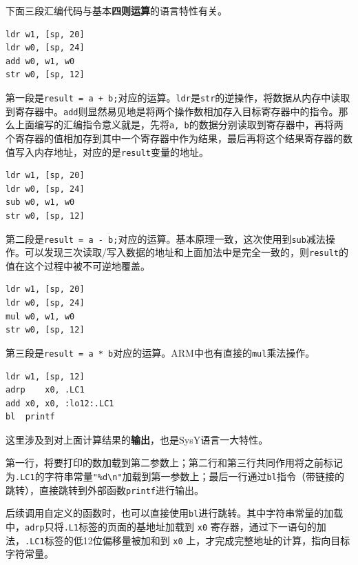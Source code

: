 \documentclass[UTF8,a4paper,10pt]{ctexart}
\begin{document}
\vspace{1em}

下面三段汇编代码与基本\textbf{四则运算}的语言特性有关。

\begin{lstlisting}[frame=trbl,language={[x86masm]Assembler}]
ldr	w1, [sp, 20]
ldr	w0, [sp, 24]
add	w0, w1, w0
str	w0, [sp, 12]
\end{lstlisting}

第一段是\texttt{result = a + b;}对应的运算。\texttt{ldr}是\texttt{str}的逆操作，将数据从内存中读取到寄存器中。\texttt{add}则显然易见地是将两个操作数相加存入目标寄存器中的指令。那么上面编写的汇编指令意义就是，先将\texttt{a, b}的数据分别读取到寄存器中，再将两个寄存器的值相加存到其中一个寄存器中作为结果，最后再将这个结果寄存器的数值写入内存地址，对应的是\texttt{result}变量的地址。


\begin{lstlisting}[frame=trbl,language={[x86masm]Assembler}]
ldr	w1, [sp, 20]
ldr	w0, [sp, 24]
sub	w0, w1, w0
str	w0, [sp, 12]
\end{lstlisting}

第二段是\texttt{result = a - b;}对应的运算。基本原理一致，这次使用到\texttt{sub}减法操作。可以发现三次读取/写入数据的地址和上面加法中是完全一致的，则\texttt{result}的值在这个过程中被不可逆地覆盖。

\begin{lstlisting}[frame=trbl,language={[x86masm]Assembler}]
ldr	w1, [sp, 20]
ldr	w0, [sp, 24]
mul	w0, w1, w0
str	w0, [sp, 12]
\end{lstlisting}

第三段是\texttt{result = a * b}对应的运算。ARM中也有直接的\texttt{mul}乘法操作。

\vspace{1em}

\begin{lstlisting}[frame=trbl,language={[x86masm]Assembler}]
ldr	w1, [sp, 12]
adrp	x0, .LC1
add	x0, x0, :lo12:.LC1
bl	printf
\end{lstlisting}

这里涉及到对上面计算结果的\textbf{输出}，也是SysY语言一大特性。

第一行，将要打印的数加载到第二参数上；第二行和第三行共同作用将之前标记为\texttt{.LC1}的字符串常量\texttt{"\%d\textbackslash n"}加载到第一参数上；最后一行通过\texttt{bl}指令（带链接的跳转），直接跳转到外部函数\texttt{printf}进行输出。

后续调用自定义的函数时，也可以直接使用\texttt{bl}进行跳转。其中字符串常量的加载中，\texttt{adrp}只将\texttt{.L1}标签的页面的基地址加载到 \texttt{x0} 寄存器，通过下一语句的加法，\texttt{.LC1}标签的低12位偏移量被加和到 \texttt{x0} 上，才完成完整地址的计算，指向目标字符常量。
\end{document}
